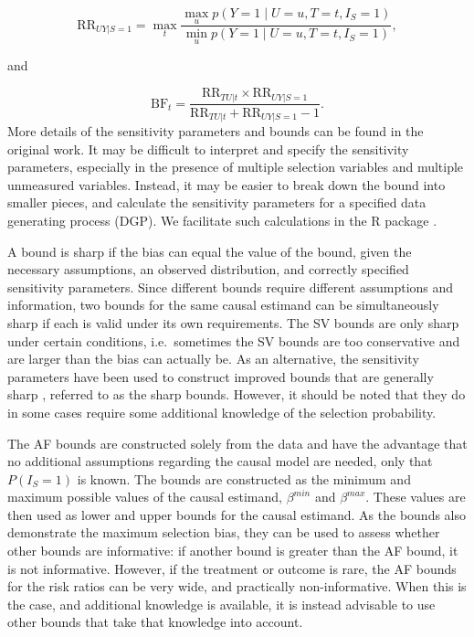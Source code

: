 \[
\mathrm{RR}_{UY|S=1} = \max_t \frac{\max_u p(Y=1 \mid U=u, T=t, I_S=1)}{\min_u p(Y=1 \mid U=u, T=t, I_S=1)},
\]

and

\[
\mathrm{BF}_{t} = \frac{\mathrm{RR}_{TU|t} \times \mathrm{RR}_{UY|S=1}}{\mathrm{RR}_{TU|t} + \mathrm{RR}_{UY|S=1} - 1}.
\]
More details of the sensitivity parameters and bounds can be found in the
original work. It may be difficult to interpret and specify the sensitivity
parameters, especially in the presence of multiple selection variables and
multiple unmeasured variables. Instead, it may be easier to break down the bound
into smaller pieces, and calculate the sensitivity parameters for a specified
data generating process (DGP). We facilitate such calculations in the R package
.

A bound is sharp if the bias can equal the value of the bound, given the
necessary assumptions, an observed distribution, and correctly specified
sensitivity parameters. Since different bounds require different assumptions
and information, two bounds for the same causal estimand can be simultaneously
sharp if each is valid under its own requirements. The SV bounds are only sharp
under certain conditions, i.e.~sometimes the SV bounds are too conservative and
are larger than the bias can actually be. As an alternative, the sensitivity
parameters have been used to construct improved bounds that are generally sharp
\citep{zetterstrom2025investigations}, referred to as the sharp bounds. However, it
should be noted that they do in some cases require some additional knowledge of
the selection probability.

The AF bounds are constructed solely from the data and have the advantage that
no additional assumptions regarding the causal model are needed, only that
\(P(I_S=1)\) is known. The bounds are constructed as the minimum and maximum
possible values of the causal estimand, \(\beta^{min}\) and \(\beta^{max}\). These
values are then used as lower and upper bounds for the causal
estimand. As the bounds also demonstrate the maximum selection bias,
they can be used to assess whether other bounds are informative: if another
bound is greater than the AF bound, it is not informative. However, if the
treatment or outcome is rare, the AF bounds for the risk ratios can be very
wide, and practically non-informative. When this is the case, and additional
knowledge is available, it is instead advisable to use other bounds that
take that knowledge into account.

